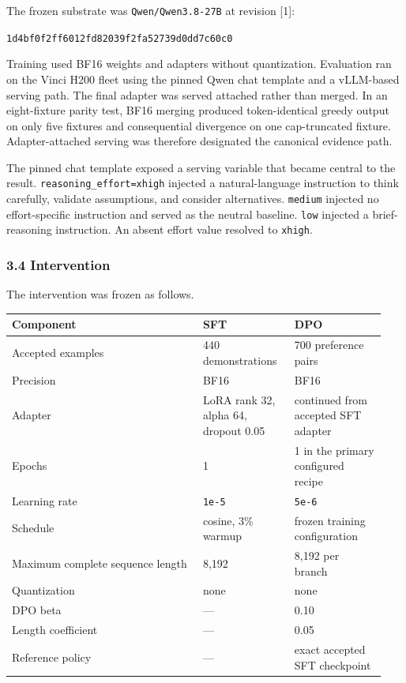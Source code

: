 \documentclass[
  9pt,
  letterpaper,
]{article}
\begin{document}
The frozen substrate was \texttt{Qwen/Qwen3.8-27B} at revision {[}1{]}:

\texttt{1d4bf0f2ff6012fd82039f2fa52739d0dd7c60c0}

Training used BF16 weights and adapters without quantization. Evaluation
ran on the Vinci H200 fleet using the pinned Qwen chat template and a
vLLM-based serving path. The final adapter was served attached rather
than merged. In an eight-fixture parity test, BF16 merging produced
token-identical greedy output on only five fixtures and consequential
divergence on one cap-truncated fixture. Adapter-attached serving was
therefore designated the canonical evidence path.

The pinned chat template exposed a serving variable that became central
to the result. \texttt{reasoning\_effort=xhigh} injected a
natural-language instruction to think carefully, validate assumptions,
and consider alternatives. \texttt{medium} injected no effort-specific
instruction and served as the neutral baseline. \texttt{low} injected a
brief-reasoning instruction. An absent effort value resolved to
\texttt{xhigh}.

\hypertarget{34-intervention}{%
\subsubsection{3.4 Intervention}\label{34-intervention}}

The intervention was frozen as follows.

\begin{longtable}[]{@{}p{0.48\linewidth}p{0.23\linewidth}p{0.23\linewidth}@{}}
\toprule\noalign{}
Component & SFT & DPO \\
\midrule\noalign{}
\endhead
\bottomrule\noalign{}
\endlastfoot
Accepted examples & 440 demonstrations & 700 preference pairs \\
Precision & BF16 & BF16 \\
Adapter & LoRA rank 32, alpha 64, dropout 0.05 & continued from accepted
SFT adapter \\
Epochs & 1 & 1 in the primary configured recipe \\
Learning rate & \texttt{1e-5} & \texttt{5e-6} \\
Schedule & cosine, 3\% warmup & frozen training configuration \\
Maximum complete sequence length & 8,192 & 8,192 per branch \\
Quantization & none & none \\
DPO beta & --- & 0.10 \\
Length coefficient & --- & 0.05 \\
Reference policy & --- & exact accepted SFT checkpoint \\
\end{longtable}
\end{document}

